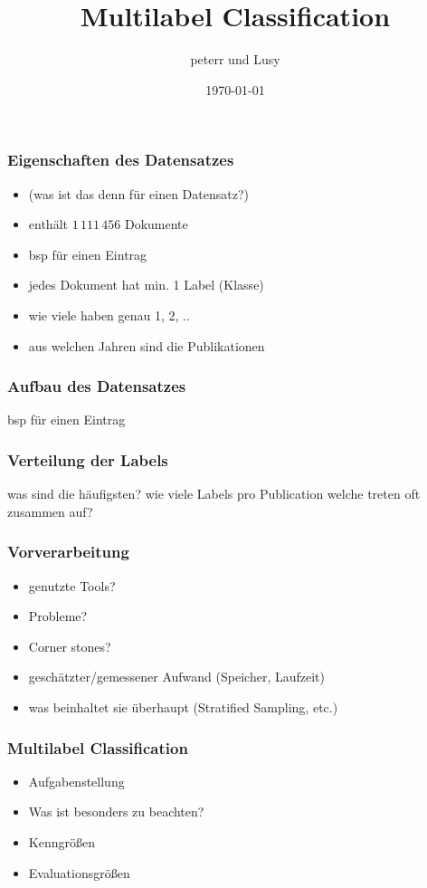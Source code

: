 \documentclass[12pt, xcolor=table]{beamer}
\begin{document}
\title{Multilabel Classification}
\author{peterr und Lusy}
\date{\today}

\begin{frame}
	\titlepage
\end{frame}

\begin{frame}
	\frametitle{Eigenschaften des Datensatzes}
	\begin{itemize}
        \item (was ist das denn für einen Datensatz?)
		\item  enthält  $1\,111\,456$ Dokumente
		\item  bsp für einen Eintrag
		\item  jedes Dokument hat min. 1 Label (Klasse)
		\item  wie viele haben genau 1, 2, ..
        \item  aus welchen Jahren sind die Publikationen
	\end{itemize}
\end{frame}

\begin{frame}
	\frametitle{Aufbau des Datensatzes}
    bsp für einen Eintrag
\end{frame}

\begin{frame}
	\frametitle{Verteilung der Labels}
    was sind die häufigsten?
    wie viele Labels pro Publication
    welche treten oft zusammen auf?
\end{frame}

\begin{frame}
	\frametitle{Vorverarbeitung}
	\begin{itemize}
		\item  genutzte Tools?
		\item  Probleme?
        \item  Corner stones?
        \item  geschätzter/gemessener Aufwand (Speicher, Laufzeit)
        \item  was beinhaltet sie überhaupt (Stratified Sampling, etc.)
	\end{itemize}
\end{frame}

\begin{frame}
	\frametitle{Multilabel Classification}
	\begin{itemize}
		\item Aufgabenstellung
		\item Was ist besonders zu beachten?
		\item Kenngrößen
        \item Evaluationsgrößen
	\end{itemize}
\end{frame}
\end{document}
